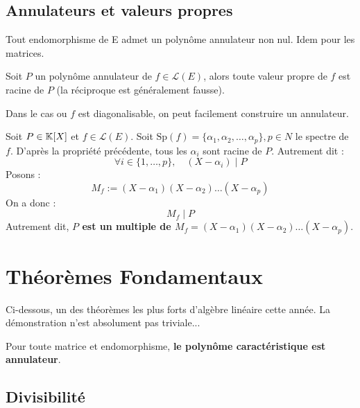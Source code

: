 \subsection{Annulateurs et valeurs propres}

\begin{proposition}
    Tout endomorphisme de E admet un polynôme annulateur non nul. 
    Idem pour les matrices. 
\end{proposition}

\begin{prop}
    Soit $P$ un polynôme annulateur de $f \in \mathcal{L}(E)$, alors toute valeur propre de $f$ est racine de $P$
    (la réciproque est généralement fausse). 
\end{prop}

\begin{remark}
    Dans le cas ou $f$ est diagonalisable, on peut facilement construire un annulateur. 
    
    Soit $P \in \mathbb{K}[X]$ et $f \in \mathcal{L}(E)$. Soit $\text{Sp}(f) = \{\alpha_1, \alpha_2, \dots, \alpha_p\}, p \in N$ 
    le spectre de $f$. D'après la propriété précédente, tous les $\alpha_i$ sont racine de $P$. 
    Autrement dit : 
        \[ \forall i \in \{1,\dots,p\}, \quad (X - \alpha_i) \; | \; P \]
    Posons :
        \[ M_f := (X - \alpha_1)(X - \alpha_2) \dots (X - \alpha_p)\]
    On a donc : 
        \[ M_f \; | \; P\]
    Autrement dit, \textbf{$P$ est un multiple de $M_f = (X - \alpha_1)(X - \alpha_2) \dots (X - \alpha_p)$}.
\end{remark}



\section{Théorèmes Fondamentaux}

Ci-dessous, un des théorèmes les plus forts d'algèbre linéaire cette année. 
La démonstration n'est absolument pas triviale...

\begin{theorem}
    Pour toute matrice et endomorphisme, \textbf{le polynôme caractéristique est annulateur}. 
\end{theorem}

\subsection{Divisibilité}

